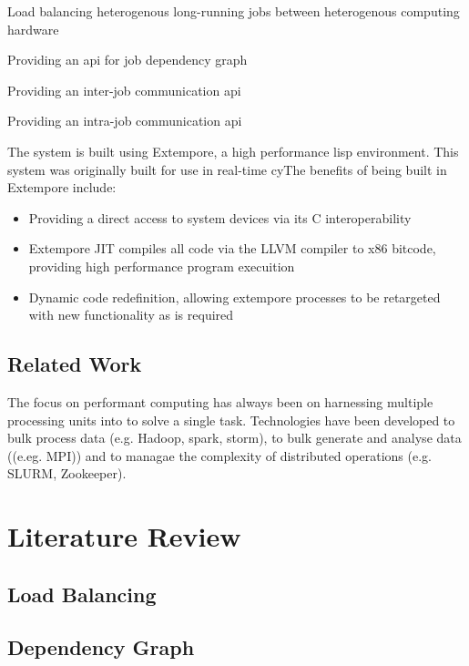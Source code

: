 \documentclass[a4paper,12pt,oldfontcommands]{memoir}
\begin{document}
\begin{Enumerate}
\item Load balancing heterogenous long-running jobs between heterogenous computing hardware
\item Providing an api for job dependency graph
\item Providing an inter-job communication api
\item Providing an intra-job communication api
\end{Enumerate}

The system is built using Extempore, a high performance lisp environment. This system was originally built for use in real-time cyThe benefits of being built in Extempore include:

\begin{itemize}
\item Providing a direct access to system devices via its C interoperability
\item Extempore \gls{JIT} compiles all code via the LLVM compiler to x86 bitcode, providing high performance program execuition
\item Dynamic code redefinition, allowing extempore processes to be retargeted with new functionality as is required
\end{itemize}


\section{Related Work}
The focus on performant computing has always been on harnessing multiple processing units into to solve a single task. Technologies have been developed to bulk process data (e.g. Hadoop, spark, storm), to bulk generate and analyse data ((e.eg. MPI)) and to managae the complexity of distributed operations (e.g. SLURM, Zookeeper).


\chapter{Literature Review}

\section{Load Balancing}

\section{Dependency Graph}
\end{document}

